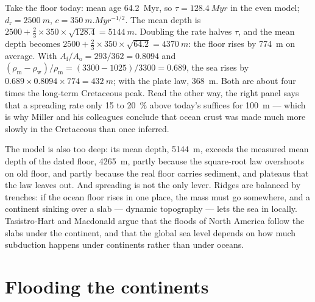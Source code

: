 \begin{example}\label{ex:b2:phanerozoic-earth:doubling}
Take the floor today: mean age \qty{64.2}{Myr}, so $\tau = \qty{128.4}{Myr}$ in the even model;
$d_{\text{r}} = \qty{2500}{m}$, $c = \qty{350}{m.Myr^{-1/2}}$. The mean depth is $2500 + \tfrac23
\times 350 \times \sqrt{128.4} = \qty{5144}{m}$. Doubling the rate halves $\tau$, and the mean
depth becomes $2500 + \tfrac23 \times 350 \times \sqrt{64.2} = \qty{4370}{m}$: the floor rises by
\qty{774}{m} on average. With $A_{\text{f}}/A_{\text{o}} = 293/362 = 0.8094$ and
$(\rho_{\text{m}} - \rho_{\text{w}})/\rho_{\text{m}} = (3300 - 1025)/3300 = 0.689$, the sea rises
by $0.689 \times 0.8094 \times 774 = \qty{432}{m}$; with the plate law, \qty{368}{m}. Both are
about four times the long-term Cretaceous peak. Read the other way, the right panel says that a
spreading rate only 15 to \qty{20}{\percent} above today's suffices for \qty{100}{m} --- which is
why Miller and his colleagues conclude that ocean crust was made much more slowly in the
Cretaceous than once inferred.
\end{example}

The model is also too deep: its mean depth, \qty{5144}{m}, exceeds the measured mean depth of
the dated floor, \qty{4265}{m}, partly because the square-root law overshoots on old floor, and
partly because the real floor carries sediment,  and plateaus that the law leaves out. And spreading is not the
only lever. Ridges are balanced by trenches: if the ocean floor rises in one place, the mass must
go somewhere, and a continent sinking over a slab --- dynamic topography --- lets the sea in
locally. Tasistro-Hart and Macdonald argue that the floods of North America follow the slabs
under the continent, and that the global sea level depends on how much subduction happens under
continents rather than under oceans.

\section{Flooding the continents}\label{sec:b2:phanerozoic-earth:flooding}

